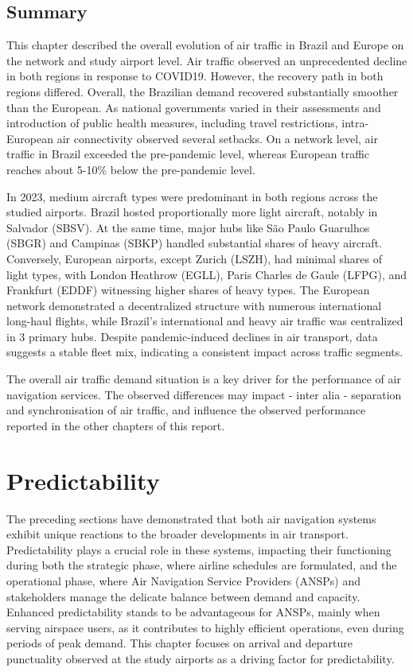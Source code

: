 \documentclass[
  a4paper,
  DIV=11,
  numbers=noendperiod]{scrreport}
\begin{document}
\hypertarget{summary-1}{%
\section{Summary}\label{summary-1}}

This chapter described the overall evolution of air traffic in Brazil
and Europe on the network and study airport level. Air traffic observed
an unprecedented decline in both regions in response to COVID19.
However, the recovery path in both regions differed. Overall, the
Brazilian demand recovered substantially smoother than the European. As
national governments varied in their assessments and introduction of
public health measures, including travel restrictions, intra-European
air connectivity observed several setbacks. On a network level, air
traffic in Brazil exceeded the pre-pandemic level, whereas European
traffic reaches about 5-10\% below the pre-pandemic level.

In 2023, medium aircraft types were predominant in both regions across
the studied airports. Brazil hosted proportionally more light aircraft,
notably in Salvador (SBSV). At the same time, major hubs like São Paulo
Guarulhos (SBGR) and Campinas (SBKP) handled substantial shares of heavy
aircraft. Conversely, European airports, except Zurich (LSZH), had
minimal shares of light types, with London Heathrow (EGLL), Paris
Charles de Gaule (LFPG), and Frankfurt (EDDF) witnessing higher shares
of heavy types. The European network demonstrated a decentralized
structure with numerous international long-haul flights, while Brazil's
international and heavy air traffic was centralized in 3 primary hubs.
Despite pandemic-induced declines in air transport, data suggests a
stable fleet mix, indicating a consistent impact across traffic
segments.

The overall air traffic demand situation is a key driver for the
performance of air navigation services. The observed differences may
impact - inter alia - separation and synchronisation of air traffic, and
influence the observed performance reported in the other chapters of
this report.


\hypertarget{predictability}{%
\chapter{Predictability}\label{predictability}}

The preceding sections have demonstrated that both air navigation
systems exhibit unique reactions to the broader developments in air
transport. Predictability plays a crucial role in these systems,
impacting their functioning during both the strategic phase, where
airline schedules are formulated, and the operational phase, where Air
Navigation Service Providers (ANSPs) and stakeholders manage the
delicate balance between demand and capacity. Enhanced predictability
stands to be advantageous for ANSPs, mainly when serving airspace users,
as it contributes to highly efficient operations, even during periods of
peak demand. This chapter focuses on arrival and departure punctuality
observed at the study airports as a driving factor for predictability.
\end{document}
